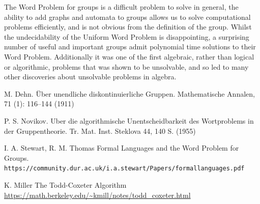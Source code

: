 \documentclass[10pt]{article}
\theoremstyle{plain}
\theoremstyle{definition}
\theoremstyle{definition}
\theoremstyle{definition}
\begin{document}
\begin{multicols}{2}
The Word Problem for groups is a difficult problem to solve in general, the ability to add graphs and automata to groups allows us to solve computational problems efficiently, and is not obvious from the definition of the group. Whilst the undecidability of the Uniform Word Problem is disappointing, a surprising number of useful and important groups admit polynomial time solutions to their Word Problem. Additionally it was one of the first algebraic, rather than logical or algorithmic, problems that was shown to be unsolvable, and so led to many other discoveries about unsolvable problems in algebra.


\end{multicols}

\medskip

\begin{thebibliography}{9}
	M. Dehn. 
	Über unendliche diskontinuierliche Gruppen.
	Mathematische Annalen, 71 (1): 116–144 (1911)

	P. S. Novikov. 
	Uber die algorithmische Unentscheidbarkeit des Wortproblems in der Gruppentheorie. 
	Tr. Mat. Inst. Steklova 44, 140 S. (1955)

	I. A. Stewart, R. M. Thomas
	Formal Languages and the Word Problem for Groups.
	\\\texttt{https://community.dur.ac.uk/i.a.stewart/Papers/formallanguages.pdf}

	K. Miller
	The Todd-Coxeter Algorithm
	\url{https://math.berkeley.edu/~kmill/notes/todd_coxeter.html}



\end{thebibliography}
\end{document}
